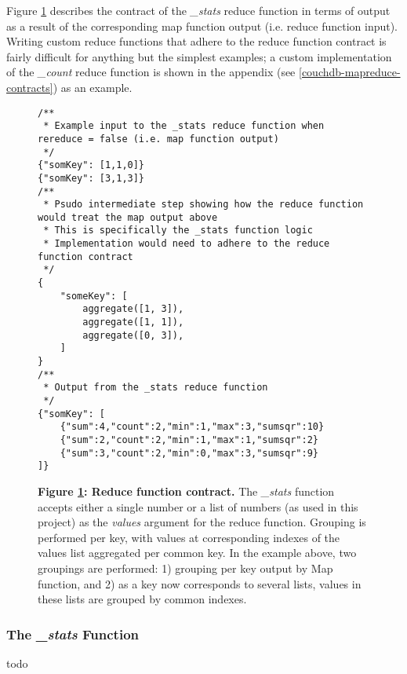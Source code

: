 Figure \ref{stats-reduce-fn} describes the contract of the \textit{\_stats} reduce function in terms of output as a result of the corresponding map function output (i.e. reduce function input). Writing custom reduce functions that adhere to the reduce function contract is fairly difficult for anything but the simplest examples; a custom implementation of the \textit{\_count} reduce function is shown in the appendix (see \ref{couchdb-mapreduce-contracts}) as an example.

\begin{figure}[ht]
    \begin{verbatim}
/**
 * Example input to the _stats reduce function when rereduce = false (i.e. map function output)
 */
{"somKey": [1,1,0]}
{"somKey": [3,1,3]}
/**
 * Psudo intermediate step showing how the reduce function would treat the map output above
 * This is specifically the _stats function logic
 * Implementation would need to adhere to the reduce function contract
 */
{
    "someKey": [
        aggregate([1, 3]),
        aggregate([1, 1]),
        aggregate([0, 3]),
    ]
}
/**
 * Output from the _stats reduce function
 */
{"somKey": [
    {"sum":4,"count":2,"min":1,"max":3,"sumsqr":10}
    {"sum":2,"count":2,"min":1,"max":1,"sumsqr":2}
    {"sum":3,"count":2,"min":0,"max":3,"sumsqr":9}
]}
    \end{verbatim}
    \caption[\textit{\_stats} function contract]{\textbf{Figure \ref{stats-reduce-fn}: Reduce function contract.} The \textit{\_stats} function accepts either a single number or a list of numbers (as used in this project) as the \textit{values} argument for the reduce function. Grouping is performed per key, with values at corresponding indexes of the values list aggregated per common key. In the example above, two groupings are performed: 1) grouping per key output by Map function, and 2) as a key now corresponds to several lists, values in these lists are grouped by common indexes.}
    \label{stats-reduce-fn}
\end{figure}

\subsubsection{The \textit{\_stats} Function}
todo